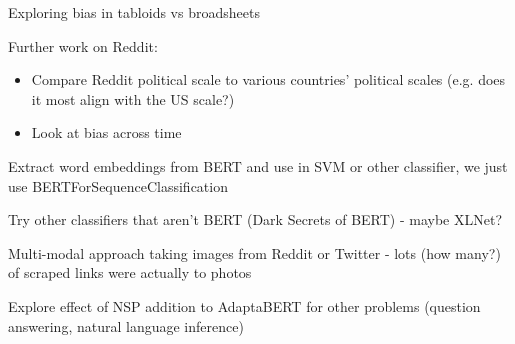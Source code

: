 Exploring bias in tabloids vs broadsheets

Further work on Reddit:
\begin{itemize}
    \item Compare Reddit political scale to various countries' political scales (e.g. does it most align with the US scale?)
    \item Look at bias across time
\end{itemize}

Extract word embeddings from BERT and use in SVM or other classifier, we just use BERTForSequenceClassification

Try other classifiers that aren't BERT (Dark Secrets of BERT) - maybe XLNet?

Multi-modal approach taking images from Reddit or Twitter - lots (how many?) of scraped links were actually to photos

Explore effect of NSP addition to AdaptaBERT for other problems (question answering, natural language inference)

